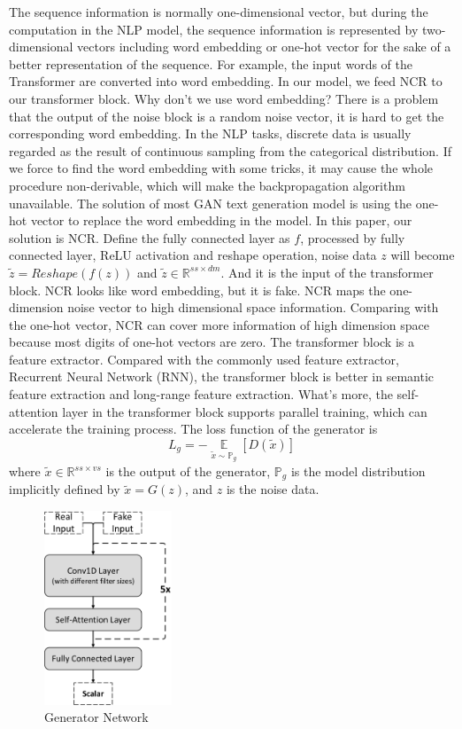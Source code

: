 The sequence information is normally one-dimensional vector, but during the computation in the NLP model, the sequence information is represented by two-dimensional vectors including word embedding or one-hot vector for the sake of a better representation of the sequence. 
For example, the input words of the Transformer are converted into word embedding. In our model, we feed NCR to our transformer block. Why don't we use word embedding? There is a problem that the output of the noise block is a random noise vector, it is hard to get the corresponding word embedding. In the NLP tasks, discrete data is usually regarded as the result of continuous sampling from the categorical distribution. If we force to find the word embedding with some tricks, it may cause the whole procedure non-derivable, which will make the backpropagation algorithm unavailable. 
The solution of most GAN text generation model is using the one-hot vector to replace the word embedding in the model. In this paper, our solution is NCR. Define the fully connected layer as $f$, processed by fully connected layer, ReLU activation and reshape operation, noise data $z$ will become $\tilde{z} = Reshape(f(z))$ and $ \tilde{z} \in \mathbb{R}^{ss \times {dm}}$. And it is the input of the transformer block.
NCR looks like word embedding, but it is fake. NCR maps the one-dimension noise vector to high dimensional space information. Comparing with the one-hot vector, NCR can cover more information of high dimension space because most digits of one-hot vectors are zero.
The transformer block is a feature extractor. Compared with the commonly used feature extractor, Recurrent Neural Network (RNN), the transformer block is better in semantic feature extraction and long-range feature extraction. What's more, the self-attention layer in the transformer block supports parallel training, which can accelerate the training process.
The loss function of the generator is 
\begin{equation}
L_{g} = - \mathop{\mathbb{E}}\limits_{\tilde{x}\sim\mathbb{P}_{g}}\left [ D(\tilde{x}) \right ] 
\end{equation}
where $\tilde{x} \in \mathbb{R}^{ss \times vs}$ is the output of the generator, $\mathbb{P}_g$ is the model distribution implicitly defined by $\tilde{x}=G(z)$, and $z$ is the noise data.

\begin{figure}[htbp]   %
	\centering 
	\includegraphics[width=1.5in]{FigSAGANFuzzer_Critic.pdf}
	\caption{Generator Network}
	\label{FigSAGANFuzzer_Critic}
\end{figure}
